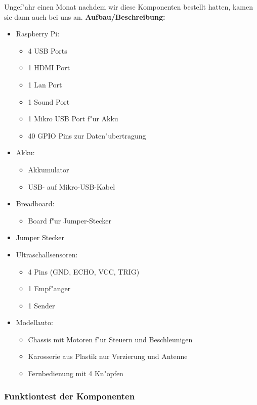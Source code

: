\documentclass[a4paper,12pt]{article}
\newenvironment{myitemize}{
	\begin{itemize}
		\setlength{\itemsep}{0pt}
		\setlength{\parskip}{0pt}
		\setlength{\parsep}{0pt}
}
{
	\end{itemize}
}
\begin{document}
Ungef"ahr einen Monat nachdem wir diese Komponenten bestellt hatten, kamen sie dann auch bei uns an. 
\newline
{\bf Aufbau/Beschreibung:}
\begin{myitemize}
	\item Raspberry Pi:
	\begin{myitemize}
		\item 4 USB Ports
		\item 1 HDMI Port
		\item 1 Lan Port
		\item 1 Sound Port
		\item 1 Mikro USB Port  f"ur Akku
		\item 40 GPIO Pins zur Daten"ubertragung
	\end{myitemize}
	\item Akku:
	\begin{myitemize}
		\item Akkumulator
		\item USB- auf Mikro-USB-Kabel
	\end{myitemize}
	\item Breadboard:
	\begin{myitemize}
		\item Board f"ur Jumper-Stecker
	\end{myitemize}
	\item Jumper Stecker
	\item Ultraschallsensoren:
	\begin{myitemize}
		\item 4 Pins (GND, ECHO, VCC, TRIG)
		\item 1 Empf"anger
		\item 1 Sender
	\end{myitemize}
	\item Modellauto:
	\begin{myitemize}
		\item Chassis mit Motoren f"ur Steuern und Beschleunigen
		\item Karosserie aus Plastik nur Verzierung und Antenne
		\item Fernbedienung mit 4 Kn"opfen
	\end{myitemize}
\end{myitemize}

\subsubsection{Funktiontest der Komponenten}\label{sec2.1.2}
\end{document}
